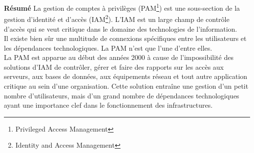 
\textbf{Résumé}  La gestion de comptes à privilèges (PAM\footnote{Privileged Access Management}) est une sous-section de la gestion d’identité et d’accès (IAM\footnote{Identity and Access Management}). L’IAM est un large champ de contrôle d’accès qui se veut critique dans le domaine des technologies de l’information.\\
Il existe bien sûr une multitude de connexions spécifiques entre les utilisateurs et les dépendances technologiques. La PAM n’est que l’une d’entre elles.\\
La PAM est apparue au début des années 2000 à cause de l’impossibilité des solutions d’IAM de contrôler, gérer et faire des rapports sur les accès aux serveurs, aux bases de données, aux équipements réseau et tout autre application critique au sein d’une organisation. Cette solution entraîne une gestion d’un petit nombre d’utilisateurs, mais d’un grand nombre de dépendances technologiques ayant une importance clef dans le fonctionnement des infrastructures.